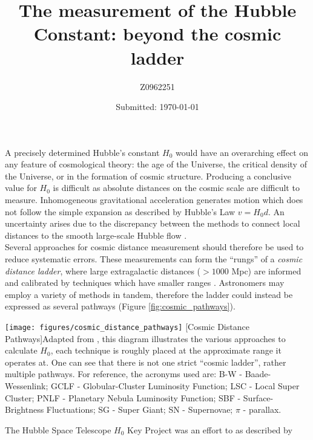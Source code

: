 \documentclass[12pt, onecolumn]{revtex4}    %
\begin{document}
                     


\title{The measurement of the Hubble Constant: beyond the cosmic ladder} 
\date{Submitted: \today{}}
\author{Z0962251}

\maketitle
\thispagestyle{plain} %

A precisely determined Hubble's constant $H_0$ would have an overarching effect on any feature of cosmological theory: the age of the Universe, the critical density of the Universe, or in the formation of cosmic structure. Producing a conclusive value for $H_0$ is difficult as absolute distances on the cosmic scale are difficult to measure. Inhomogeneous gravitational acceleration generates motion which does not follow the simple expansion as described by Hubble's Law $v=H_0 d$. An uncertainty arises due to the discrepancy between the methods to connect local distances to the smooth large-scale Hubble flow \citep{fukugita_cosmic}. \\

Several approaches for cosmic distance measurement should therefore be used to reduce systematic errors. These measurements can form the ``rungs'' of a \textit{cosmic distance ladder}, where large extragalactic distances ($>1000$ Mpc) are informed and calibrated by techniques which have smaller ranges \citep{carroll_astro}. Astronomers may employ a variety of methods in tandem, therefore the ladder could instead be expressed as several pathways (Figure \ref{fig:cosmic_pathways}). 


\begin{center}
\texttt{[image: figures/cosmic\_distance\_pathways]}
[Cosmic Distance Pathways]{Adapted from \cite{jacoby_extragal}, this diagram illustrates the various approaches to calculate $H_0$, each technique is roughly placed at the approximate range it operates at. One can see that there is not one strict ``cosmic ladder'', rather multiple pathways. For reference, the acronyms used are: B-W - Baade-Wessenlink; GCLF - Globular-Cluster Luminosity Function; LSC - Local Super Cluster; PNLF - Planetary Nebula Luminosity Function; SBF - Surface-Brightness Fluctuations; SG - Super Giant; SN - Supernovae; $\pi$ - parallax.}
\label{fig:cosmic_pathways}
\end{center}

The Hubble Space Telescope $H_0$ Key Project was an effort to  as described by \cite{freedman_hstkeystone}

\newpage





\newpage
\end{document}
